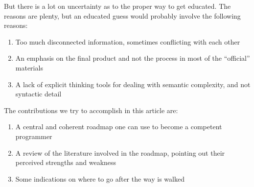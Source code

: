 But there is a lot on uncertainty as to the proper way to get educated. The
reasons are plenty, but an educated guess would probably involve the following
reasons:

\begin{enumerate}
    \item Too much disconnected information, sometimes conflicting with each other
    \item An emphasis on the final product and not the process in most of the
    ``official'' materials \cite{education:harvey__symbolic_programming_vs_AP_curriculum}
    \item A lack of explicit thinking tools for dealing with semantic
    complexity, and not syntactic detail\cite{education:felleisen__sicsc}
\end{enumerate}


The contributions we try to accomplish in this article are:

\begin{enumerate}
    \item A central and coherent roadmap one can use to become a competent
    programmer
    \item A review of the literature involved in the roadmap, pointing out their
    perceived strengths and weakness

    \item Some indications on where to go after the way is walked
\end{enumerate}
